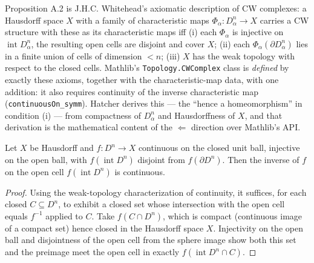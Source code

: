 Proposition A.2 is J.H.C. Whitehead's axiomatic description of CW complexes: a
Hausdorff space $X$ with a family of characteristic maps
$\Phi_\alpha : D^n_\alpha \to X$ carries a CW structure with these as its
characteristic maps iff (i) each $\Phi_\alpha$ is injective on
$\operatorname{int} D^n_\alpha$, the resulting open cells are disjoint and cover
$X$; (ii) each $\Phi_\alpha(\partial D^n_\alpha)$ lies in a finite union of cells
of dimension $< n$; (iii) $X$ has the weak topology with respect to the closed
cells. Mathlib's \texttt{Topology.CWComplex} class is \emph{defined} by exactly
these axioms, together with the characteristic-map data, with one addition: it
also requires continuity of the inverse characteristic map
(\texttt{continuousOn\_symm}). Hatcher derives this --- the ``hence a
homeomorphism'' in condition (i) --- from compactness of $D^n_\alpha$ and
Hausdorffness of $X$, and that derivation is the mathematical content of the
$\Leftarrow$ direction over Mathlib's API.

\begin{lemma}
    \label{lem:whitehead-inverse-homeo}
    \leanok
    Let $X$ be Hausdorff and $f : D^n \to X$ continuous on the closed unit ball,
    injective on the open ball, with $f(\operatorname{int} D^n)$ disjoint from
    $f(\partial D^n)$. Then the inverse of $f$ on the open cell
    $f(\operatorname{int} D^n)$ is continuous.
\end{lemma}
\begin{proof}
    Using the weak-topology characterization of continuity, it suffices, for
    each closed $C \subseteq D^n$, to exhibit a closed set whose intersection
    with the open cell equals $f^{-1}$ applied to $C$. Take $f(C \cap D^n)$,
    which is compact (continuous image of a compact set) hence closed in the
    Hausdorff space $X$. Injectivity on the open ball and disjointness of the
    open cell from the sphere image show both this set and the preimage meet the
    open cell in exactly $f(\operatorname{int} D^n \cap C)$.
\end{proof}


